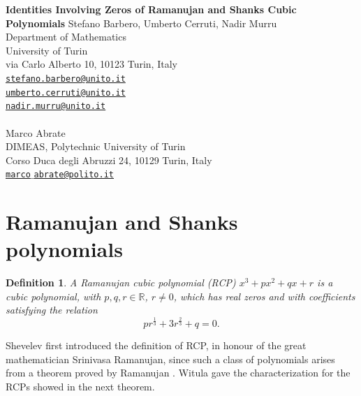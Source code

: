 \documentclass[12pt,reqno]{article}
\newtheorem{defin}[theorem]{Definition}
\newenvironment{definition}{\begin{defin}\normalfont\quad}{\end{defin}}
\begin{document}
\begin{center}
\vskip 1cm{\LARGE\bf Identities Involving Zeros of Ramanujan and Shanks Cubic Polynomials }
\vskip 1cm
\large
Stefano Barbero, Umberto Cerruti, Nadir Murru\\
Department of Mathematics \\
University of  Turin \\
via Carlo Alberto 10, 10123 Turin, Italy\\
\href{mailto:stefano.barbero@unito.it}{\tt stefano.barbero@unito.it}\\
\href{mailto:umberto.cerruti@unito.it}{\tt umberto.cerruti@unito.it}\\
\href{mailto:nadir.murru@unito.it}{\tt nadir.murru@unito.it}\\
\ \\
Marco Abrate\\
DIMEAS, Polytechnic University of Turin\\
Corso Duca degli Abruzzi 24, 10129 Turin, Italy\\

\href{mailto:marco$\_$abrate@polito.it}{\tt marco$\_$abrate@polito.it}\\
\end{center}


\begin{abstract}
In this paper we highlight the connection between Ramanujan cubic polynomials (RCPs) and a class of polynomials, the Shanks cubic polynomials (SCPs), which generate cyclic cubic fields. In this way we provide a new characterization for RCPs and we express the zeros of any RCP in explicit form, using trigonometric functions. Moreover, we observe that a cyclic transform of period three permutes these zeros. As a consequence of these results we provide many new and beautiful identities. Finally we connect RCPs to Gaussian periods, finding a new identity, and we study some integer sequences related to SCPs .
\end{abstract}

\section{Ramanujan and Shanks polynomials}
\begin{definition} A \emph{Ramanujan cubic polynomial} (RCP) $x^3+px^2+qx+r$ is a cubic polynomial, with $p,q,r \in \mathbb R$, $r\not = 0$, which has real zeros and with coefficients satisfying the relation
\begin{equation} \label{cond1-rcp} pr^{\frac{1}{3}}+3r^{\frac{2}{3}}+q=0. \end{equation}
\end{definition}
Shevelev \cite{She} first introduced the definition of RCP, in honour of the great mathematician Srinivasa Ramanujan, since such a class of polynomials arises from a theorem proved by Ramanujan \cite{Rama}. Witula  \cite{Witula} gave the characterization for the RCPs showed in the next theorem.
\end{document}
